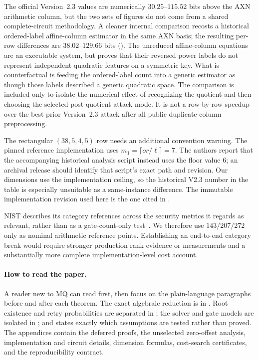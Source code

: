 \documentclass[11pt]{article}
\begin{document}
The official Version~2.3 values are numerically $30.25$--$115.52$ bits above
the AXN arithmetic column, but the two sets of figures do not come from a
shared complete-circuit methodology.  A cleaner internal comparison recosts a
historical ordered-label affine-column estimator in the same AXN basis; the
resulting per-row differences are $38.02$--$129.66$ bits
().  The unreduced affine-column equations are an
executable system, but  proves that their reversed
power labels do not represent independent quadratic features on a symmetric
key.  What is counterfactual is feeding the ordered-label count into a generic
estimator as though those labels described a generic quadratic space.  The
comparison is included only to isolate the numerical effect of recognizing
the quotient and then choosing the selected post-quotient attack mode.  It is
not a row-by-row speedup over the best prior Version~2.3 attack after all
public duplicate-column preprocessing.

The rectangular $(38,5,4,5)$ row needs an additional convention warning.  The
pinned reference implementation uses
$m_1=\lceil or/\ell\rceil=7$.  The authors report that the accompanying
historical analysis script instead uses the floor value $6$; an archival
release should identify that script's exact path and revision.  Our dimensions
use the implementation ceiling, so the historical V2.3 number in the table is
especially unsuitable as a same-instance difference.  The immutable
implementation revision used here is the one cited in \cite{SNOVA23}.

NIST describes its category references across the security metrics it regards
as relevant, rather than as a gate-count-only test~\cite{NISTPQCCriteria}.  We
therefore use $143/207/272$ only as nominal arithmetic reference points.
Establishing an end-to-end category break would require stronger production
rank evidence or measurements and a substantially more complete
implementation-level cost account.

\paragraph{How to read the paper.}
A reader new to MQ can read  first, then focus on the
plain-language paragraphs before and after each theorem.  The exact algebraic
reduction is in .  Root existence and
retry probabilities are separated in ; the solver and gate
models are isolated in ; and
 states exactly which assumptions are tested rather than
proved.  The appendices contain the deferred proofs, the unselected
zero-offset analysis, implementation and circuit details, dimension formulas,
cost-search certificates, and the reproducibility contract.
\end{document}

